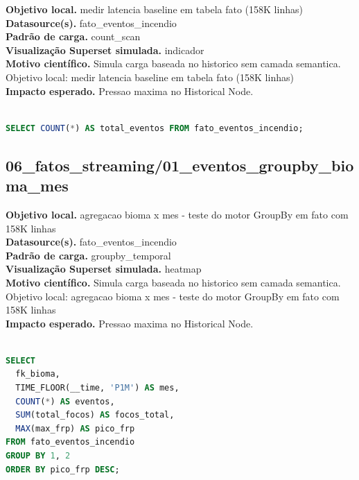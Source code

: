 \documentclass[11pt,a4paper]{article}
\begin{document}
\textbf{Objetivo local.} medir latencia baseline em tabela fato (158K linhas)\\

\textbf{Datasource(s).} fato\_eventos\_incendio\\

\textbf{Padrão de carga.} count\_scan\\

\textbf{Visualização Superset simulada.} indicador\\

\textbf{Motivo científico.} Simula carga baseada no historico sem camada semantica. Objetivo local: medir latencia baseline em tabela fato (158K linhas)\\

\textbf{Impacto esperado.} Pressao maxima no Historical Node.

\begin{lstlisting}[language=SQL]

SELECT COUNT(*) AS total_eventos FROM fato_eventos_incendio;

\end{lstlisting}

\subsection{06\_fatos\_streaming/01\_eventos\_groupby\_bioma\_mes}

\textbf{Objetivo local.} agregacao bioma x mes - teste do motor GroupBy em fato com 158K linhas\\

\textbf{Datasource(s).} fato\_eventos\_incendio\\

\textbf{Padrão de carga.} groupby\_temporal\\

\textbf{Visualização Superset simulada.} heatmap\\

\textbf{Motivo científico.} Simula carga baseada no historico sem camada semantica. Objetivo local: agregacao bioma x mes - teste do motor GroupBy em fato com 158K linhas\\

\textbf{Impacto esperado.} Pressao maxima no Historical Node.

\begin{lstlisting}[language=SQL]

SELECT
  fk_bioma,
  TIME_FLOOR(__time, 'P1M') AS mes,
  COUNT(*) AS eventos,
  SUM(total_focos) AS focos_total,
  MAX(max_frp) AS pico_frp
FROM fato_eventos_incendio
GROUP BY 1, 2
ORDER BY pico_frp DESC;

\end{lstlisting}
\end{document}
